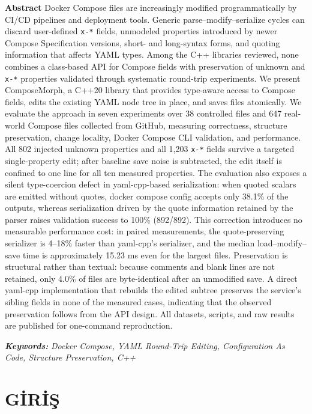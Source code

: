 \documentclass[12pt,a4paper]{article}
\begin{document}
\bigskip

\noindent\textbf{Abstract} Docker Compose files are increasingly modified programmatically by CI/CD pipelines and deployment tools. Generic parse--modify--serialize cycles can discard user-defined \texttt{x-*} fields, unmodeled properties introduced by newer Compose Specification versions, short- and long-syntax forms, and quoting information that affects YAML types. Among the C++ libraries reviewed, none combines a class-based API for Compose fields with preservation of unknown and \texttt{x-*} properties validated through systematic round-trip experiments. We present ComposeMorph, a C++20 library that provides type-aware access to Compose fields, edits the existing YAML node tree in place, and saves files atomically. We evaluate the approach in seven experiments over 38 controlled files and 647 real-world Compose files collected from GitHub, measuring correctness, structure preservation, change locality, Docker Compose CLI validation, and performance. All 802 injected unknown properties and all 1,203 \texttt{x-*} fields survive a targeted single-property edit; after baseline save noise is subtracted, the edit itself is confined to one line for all ten measured properties. The evaluation also exposes a silent type-coercion defect in yaml-cpp-based serialization: when quoted scalars are emitted without quotes, docker compose config accepts only 38.1\% of the outputs, whereas serialization driven by the quote information retained by the parser raises validation success to 100\% (892/892). This correction introduces no measurable performance cost: in paired measurements, the quote-preserving serializer is 4--18\% faster than yaml-cpp's serializer, and the median load--modify--save time is approximately 15.23 ms even for the largest files. Preservation is structural rather than textual: because comments and blank lines are not retained, only 4.0\% of files are byte-identical after an unmodified save. A direct yaml-cpp implementation that rebuilds the edited subtree preserves the service's sibling fields in none of the measured cases, indicating that the observed preservation follows from the API design. All datasets, scripts, and raw results are published for one-command reproduction.

\smallskip\noindent\textbf{\textit{Keywords:}} \textit{Docker Compose, YAML Round-Trip Editing, Configuration As Code, Structure Preservation, C++}

\bigskip

\section{GİRİŞ}
\label{sec:giris}
\end{document}
